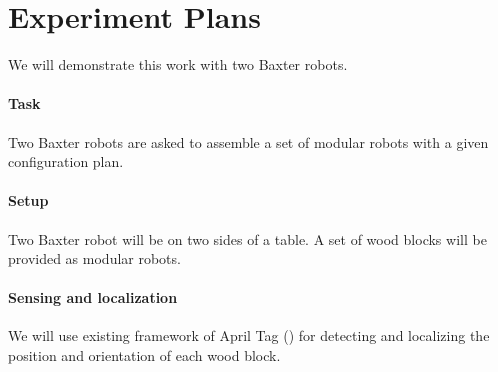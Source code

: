 \section{Experiment Plans}
We will demonstrate this work with two Baxter robots.
\paragraph{Task} Two Baxter robots are asked to assemble a set of modular robots with a given configuration plan.
\paragraph{Setup} Two Baxter robot will be on two sides of a table. A set of wood blocks will be provided as modular robots.
\paragraph{Sensing and localization} We will use existing framework of April Tag () for detecting and localizing the position and orientation of each wood block.

